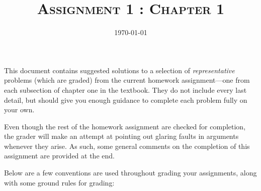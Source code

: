 \documentclass{amsart}
\title{\textsc{Assignment 1 : Chapter 1}}
\date{\today}
\theoremstyle{definition}
\theoremstyle{definition}
\DeclareMathOperator{\1}{\mathbbm{1}}
\begin{document}
\sloppy
\maketitle


This document contains suggested solutions to a selection of \textit{representative} problems (which are graded) from the current homework assignment---one from each subsection of chapter one in the textbook. They do not include every last detail, but should give you enough guidance to complete each problem fully on your own. 

Even though the rest of the homework assignment are checked for completion, the grader will make an attempt at pointing out glaring faults in arguments whenever they arise. As such, some general comments on the completion of this assignment are provided at the end. 

Below are a few conventions are used throughout grading your assignments, along with some ground rules for grading:
\end{document}
